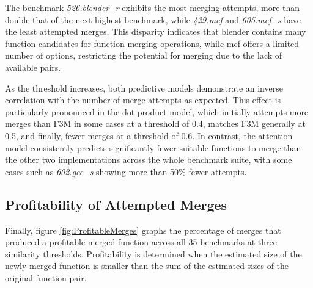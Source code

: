 The benchmark \textit{526.blender\_r} exhibits the most merging attempts, more than double that of the next highest benchmark, while \textit{429.mcf} and \textit{605.mcf\_s} have the least attempted merges. This disparity indicates that blender contains many function candidates for function merging operations, while mcf offers a limited number of options, restricting the potential for merging due to the lack of available pairs.

As the threshold increases, both predictive models demonstrate an inverse correlation with the number of merge attempts as expected. This effect is particularly pronounced in the dot product model, which initially attempts more merges than F3M in some cases at a threshold of 0.4, matches F3M generally at 0.5, and finally, fewer merges at a threshold of 0.6. In contrast, the attention model consistently predicts significantly fewer suitable functions to merge than the other two implementations across the whole benchmark suite, with some cases such as \textit{602.gcc\_s} showing more than 50\% fewer attempts.



\subsection{Profitability of Attempted Merges}
Finally, figure \ref{fig:ProfitableMerges} graphs the percentage of merges that produced a profitable merged function across all 35 benchmarks at three similarity thresholds. Profitability is determined when the estimated size of the newly merged function is smaller than the sum of the estimated sizes of the original function pair.

